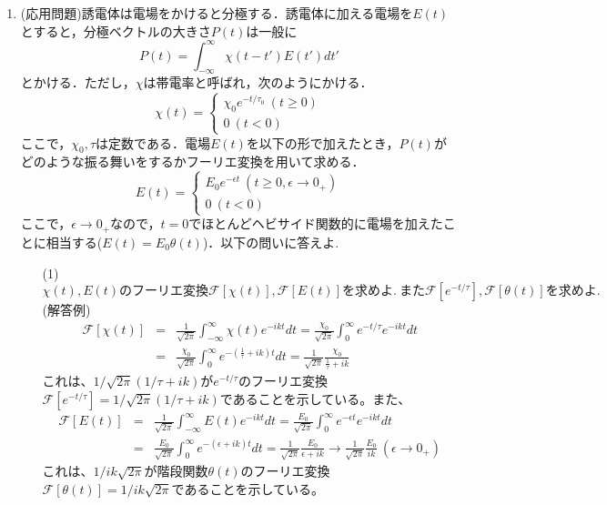 \documentclass[11pt]{jsarticle}
\begin{document}
\begin{enumerate}
\begin{enumerate}
\end{enumerate}

\newpage
\item (応用問題)誘電体は電場をかけると分極する．誘電体に加える電場を$E(t)$とすると，分極ベクトルの大きさ$P(t)$は一般に
\begin{equation*}
P(t)=\int_{-\infty}^{\infty} \chi (t-t') E(t')dt'
\end{equation*}
とかける．ただし，$\chi$は帯電率と呼ばれ，次のようにかける．
\begin{equation*}
\chi(t)=
  \begin{cases}
    \chi_{0}e^{-t/\tau_{0}} \ (t \geq 0)\\
    0 \ (t<0)
  \end{cases}
\end{equation*}
ここで，$\chi_{0}, \tau$は定数である．電場$E(t)$を以下の形で加えたとき，$P(t)$がどのような振る舞いをするかフーリエ変換を用いて求める．
\begin{equation*}
E(t)=
  \begin{cases}
    E_{0}e^{-\epsilon t} \ (t \geq 0, \epsilon \rightarrow 0_{+})\\
    0 \ (t<0)
  \end{cases}
\end{equation*}
ここで，$\epsilon \rightarrow 0_{+}$なので，$t=0$でほとんどヘビサイド関数的に電場を加えたことに相当する($E(t)=E_{0} \theta (t)$)．以下の問いに答えよ.\\

\begin{enumerate}
\item[(1)] $\chi (t),E(t)のフーリエ変換\mathcal{F}[\chi (t)],\mathcal{F}[E(t)] を求めよ.~また\mathcal{F}[e^{-t/\tau}],\mathcal{F}[\theta (t)]を求めよ.$\\
(解答例)
\begin{eqnarray*}
\mathcal{F}[\chi(t)]&=&\frac{1}{\sqrt{2\pi}}\int_{-\infty}^{\infty} \chi(t)e^{-ik t}dt=\frac{\chi_0}{\sqrt{2\pi}}\int_{0}^{\infty}e^{-t/\tau}e^{-ik t}dt\\
&=&\frac{\chi_0}{\sqrt{2\pi}}\int_{0}^{\infty}e^{-\left( \frac{1}{\tau}+ik\right)t}dt=\frac{1}{\sqrt{2\pi}}\frac{\chi_{0}}{ \frac{1}{\tau}+ik}
\end{eqnarray*}
これは、$1/\sqrt{2\pi}(1/\tau+ik)$が$e^{-t/\tau}$のフーリエ変換$\mathcal{F}[e^{-t/\tau}]=1/\sqrt{2\pi}(1/\tau+ik)$であることを示している。また、
\begin{eqnarray*}
\mathcal{F}[E(t)]&=&\frac{1}{\sqrt{2\pi}}\int_{-\infty}^{\infty} E(t)e^{-ik t}dt=\frac{E_0}{\sqrt{2\pi}}\int_{0}^{\infty}e^{-\epsilon t}e^{-ikt}dt\\
&=&\frac{E_0}{\sqrt{2\pi}}\int_{0}^{\infty} e^{-(\epsilon+ik)t}dt=\frac{1}{\sqrt{2\pi}}\frac{E_{0}}{\epsilon+ik} \rightarrow \frac{1}{\sqrt{2\pi}}\frac{E_{0}}{ik} \ (\epsilon \rightarrow 0_{+})
\end{eqnarray*}
これは、$1/ik\sqrt{2\pi}$が階段関数$\theta(t)$のフーリエ変換$\mathcal{F}[\theta(t)]=1/ik\sqrt{2\pi}$であることを示している。


\end{enumerate}
\end{enumerate}
\end{document}
